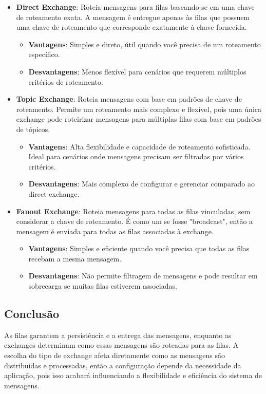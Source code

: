 \documentclass{article}
\begin{document}
	\begin{itemize}
		\item \textbf{Direct Exchange}: Roteia mensagens para filas baseando-se em uma chave de roteamento exata. A mensagem é entregue apenas às filas que possuem uma chave de roteamento que corresponde exatamente à chave fornecida. 
		\begin{itemize}
			\item \textbf{Vantagens}: Simples e direto, útil quando você precisa de um roteamento específico.
			\item \textbf{Desvantagens}: Menos flexível para cenários que requerem múltiplos critérios de roteamento.
		\end{itemize}
		
		\item \textbf{Topic Exchange}: Roteia mensagens com base em padrões de chave de roteamento. Permite um roteamento mais complexo e flexível, pois uma única exchange pode roteirizar mensagens para múltiplas filas com base em padrões de tópicos.
		\begin{itemize}
			\item \textbf{Vantagens}: Alta flexibilidade e capacidade de roteamento sofisticada. Ideal para cenários onde mensagens precisam ser filtradas por vários critérios.
			\item \textbf{Desvantagens}: Mais complexo de configurar e gerenciar comparado ao direct exchange.
		\end{itemize}
		
		\item \textbf{Fanout Exchange}: Roteia mensagens para todas as filas vinculadas, sem considerar a chave de roteamento. É como um se fosse "broadcast", então a mensagem é enviada para todas as filas associadas à exchange.
		\begin{itemize}
			\item \textbf{Vantagens}: Simples e eficiente quando você precisa que todas as filas recebam a mesma mensagem.
			\item \textbf{Desvantagens}: Não permite filtragem de mensagens e pode resultar em sobrecarga se muitas filas estiverem associadas.
		\end{itemize}
	\end{itemize}
	
	\subsection*{Conclusão}
	
	As filas garantem a persistência e a entrega das mensagens, enquanto as exchanges determinam como essas mensagens são roteadas para as filas. A escolha do tipo de exchange afeta diretamente como as mensagens são distribuídas e processadas, então a configuração depende da necessidade da aplicação, pois isso acabará influenciando a flexibilidade e eficiência do sistema de mensagens.
	

	
\end{document}

